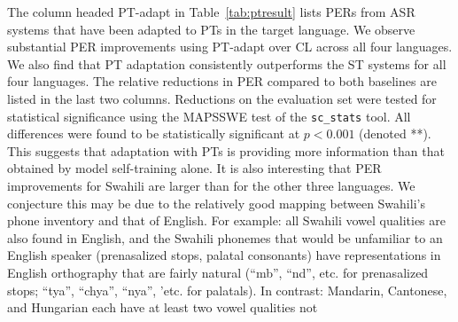 The column headed {\sc PT-adapt} in Table~\ref{tab:ptresult} lists
PERs from ASR systems that have been adapted to PTs in the target
language. We observe substantial PER improvements using {\sc PT-adapt}
over {\sc CL} across all four languages. We also find that PT
adaptation consistently outperforms the {\sc ST} systems for all four
languages. The relative reductions in PER compared to both baselines
are listed in the last two columns.  Reductions on the evaluation set
were tested for statistical significance using the MAPSSWE test of the
{\tt sc\_stats} tool.  All differences were found to be statistically
significant at $p<0.001$ (denoted **).  This suggests that adaptation
with PTs is providing more information than that obtained by model
self-training alone. It is also interesting that PER
improvements for Swahili are larger than for the other three
languages. %
We conjecture this may be due to the relatively good mapping between
Swahili's phone inventory and that of English. For example: all Swahili
vowel qualities are also found in English, and the Swahili phonemes 
that would be unfamiliar to an English speaker (prenasalized stops, 
palatal consonants) have representations in English orthography that are 
fairly natural (``mb'', ``nd'', etc. for prenasalized stops; ``tya'', 
``chya'', ``nya'', 'etc. for palatals). In contrast: Mandarin, 
Cantonese, and Hungarian each have at least two vowel qualities not 
